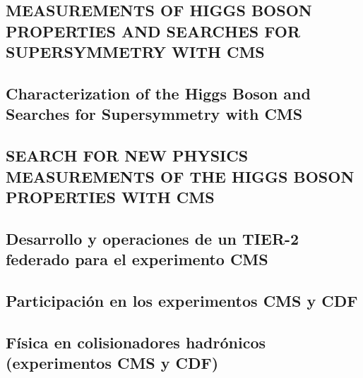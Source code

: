 \documentclass[a4paper, 11pt, twoside, openright]{report}
\begin{document}
\subsection{MEASUREMENTS OF HIGGS BOSON PROPERTIES AND SEARCHES FOR SUPERSYMMETRY WITH CMS}


\subsection{Characterization of the Higgs Boson and Searches for Supersymmetry with CMS}


\subsection{SEARCH FOR NEW PHYSICS MEASUREMENTS OF THE HIGGS BOSON PROPERTIES WITH CMS}


\subsection{Desarrollo y operaciones de un TIER-2 federado para el experimento CMS}


\subsection{Participación en los experimentos CMS y CDF}


\subsection{Física en colisionadores hadrónicos (experimentos CMS y CDF)}

\end{document}
